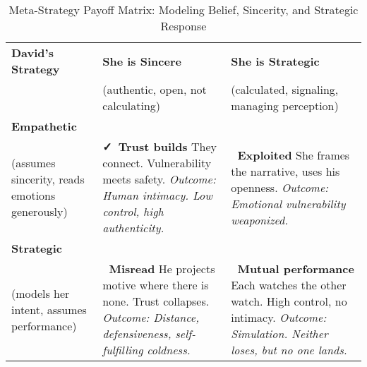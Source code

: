 \begin{table}[H]
  \centering
  \renewcommand{\arraystretch}{1.6}
  \begin{tabular}{>{\raggedright\arraybackslash}p{3.5cm} 
                  >{\raggedright\arraybackslash}p{5.5cm} 
                  >{\raggedright\arraybackslash}p{5.5cm}}
  \toprule
  \textbf{David’s Strategy} 
  & \textbf{She is Sincere}
  & \textbf{She is Strategic}\\
  \ 
  &
  (authentic, open, not calculating) 
  &
  (calculated, signaling, managing perception) \\

  \midrule
  
  \textbf{Empathetic} \\
  (assumes sincerity, reads emotions generously) 
  
  & \textbf{\faCheck\ Trust builds} \newline
  They connect. Vulnerability meets safety. \newline
  \textit{Outcome: Human intimacy. Low control, high authenticity.}
  
  & \textbf{\faTimes\ Exploited} \newline
  She frames the narrative, uses his openness. \newline
  \textit{Outcome: Emotional vulnerability weaponized.} \\
  
  \midrule
  
  \textbf{Strategic} \\ 
  (models her intent, assumes performance)
  
  & \textbf{\faTimes\ Misread} \newline
  He projects motive where there is none. Trust collapses. \newline
  \textit{Outcome: Distance, defensiveness, self-fulfilling coldness.}
  
  & \textbf{\faGavel\ Mutual performance} \newline
  Each watches the other watch. High control, no intimacy. \newline
  \textit{Outcome: Simulation. Neither loses, but no one lands.} \\
  
  \bottomrule
  \end{tabular}
  \caption{Meta-Strategy Payoff Matrix: Modeling Belief, Sincerity, and Strategic Response}
\end{table}


\medskip

